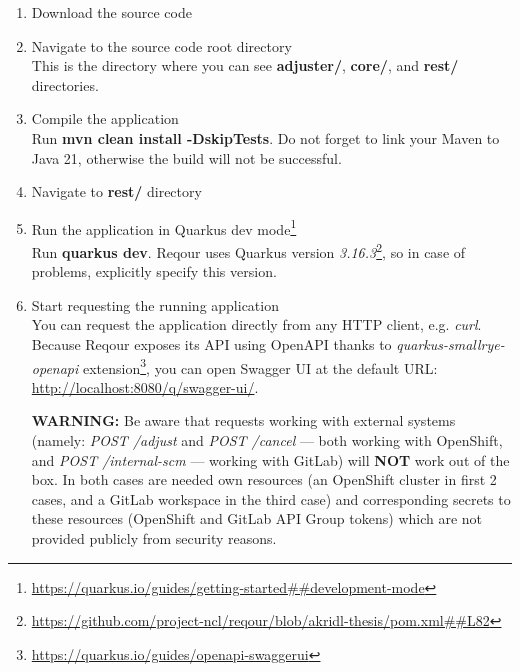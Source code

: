 \documentclass[../main.tex]{subfiles}
\begin{document}
\begin{enumerate}
    \item Download the source code\\
    
    \item Navigate to the source code root directory\\
    This is the directory where you can see \textbf{adjuster/}, \textbf{core/}, and \textbf{rest/} directories.

    \item Compile the application\\
    Run \textbf{mvn clean install -DskipTests}. Do not forget to link your Maven to Java 21, otherwise the build will not be successful.

    \item Navigate to \textbf{rest/} directory\\

    \item Run the application in Quarkus dev mode\footnote{\url{https://quarkus.io/guides/getting-started##development-mode}}\\
    Run \textbf{quarkus dev}. Reqour uses Quarkus version \textit{3.16.3}\footnote{\url{https://github.com/project-ncl/reqour/blob/akridl-thesis/pom.xml##L82}}, so in case of problems, explicitly specify this version.

    \item Start requesting the running application\\
    You can request the application directly from any HTTP client, e.g. \textit{curl}. Because Reqour exposes its API using OpenAPI thanks to \textit{quarkus-smallrye-openapi} extension\footnote{\url{https://quarkus.io/guides/openapi-swaggerui}}, you can open Swagger UI at the default URL: \url{http://localhost:8080/q/swagger-ui/}.

    \textbf{WARNING:} Be aware that requests working with external systems (namely: \textit{POST /adjust} and \textit{POST /cancel} — both working with OpenShift, and \textit{POST /internal-scm} — working with GitLab) will \textbf{NOT} work out of the box. In both cases are needed own resources (an OpenShift cluster in first 2 cases, and a GitLab workspace in the third case) and corresponding secrets to these resources (OpenShift and GitLab API Group tokens) which are not provided publicly from security reasons.
\end{enumerate}
\end{document}
